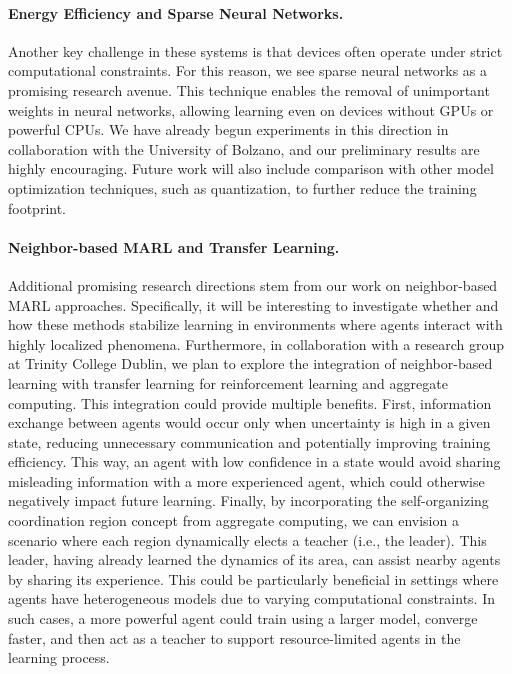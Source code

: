 \documentclass[12pt]{article}
\begin{document}
\paragraph{Energy Efficiency and Sparse Neural Networks.}
Another key challenge in these systems is that devices often operate under strict computational constraints. 
%
For this reason, we see sparse neural networks as a promising research avenue. 
%
This technique enables the removal of unimportant weights in neural networks, allowing learning even on devices without 
 GPUs or powerful CPUs. 
% 
We have already begun experiments in this direction in collaboration with the University of Bolzano, 
 and our preliminary results are highly encouraging. 
% 
Future work will also include comparison with other model optimization techniques, such as quantization, 
 to further reduce the training footprint.

\paragraph{Neighbor-based MARL and Transfer Learning.}
Additional promising research directions stem from our work on neighbor-based MARL approaches.
%
Specifically, it will be interesting to investigate whether and how these methods stabilize learning in environments 
 where agents interact with highly localized phenomena. 
% 
Furthermore, in collaboration with a research group at Trinity College Dublin, we plan to explore the integration of neighbor-based 
 learning with transfer learning for reinforcement learning and aggregate computing.
%
This integration could provide multiple benefits. 
%
First, information exchange between agents would occur only when uncertainty is high in a given state, reducing unnecessary communication 
 and potentially improving training efficiency. 
% 
This way, an agent with low confidence in a state would avoid sharing misleading information with a more experienced agent, 
 which could otherwise negatively impact future learning.
%
Finally, by incorporating the self-organizing coordination region concept from aggregate computing, we can envision a scenario where 
 each region dynamically elects a teacher (i.e., the leader).
% 
This leader, having already learned the dynamics of its area, can assist nearby agents by sharing its experience. 
%
This could be particularly beneficial in settings where agents have heterogeneous models due to varying computational constraints. 
%
In such cases, a more powerful agent could train using a larger model, converge faster, and then act as a teacher to support resource-limited 
 agents in the learning process.
\end{document}
